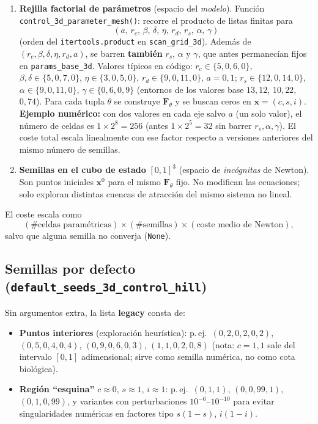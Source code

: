 \documentclass[11pt,a4paper]{article}
\begin{document}
\begin{enumerate}[label=\textbf{\arabic*.},leftmargin=*]
  \item \textbf{Rejilla factorial de parámetros} (espacio del \emph{modelo}). Función \texttt{control\_3d\_parameter\_mesh()}: recorre el producto de listas finitas para
  \[
  (a,\,r_c,\,\beta,\,\delta,\,\eta,\,r_d,\,r_s,\,\alpha,\,\gamma)
  \]
  (orden del \texttt{itertools.product} en \texttt{scan\_grid\_3d}). Además de $(r_c,\beta,\delta,\eta,r_d,a)$, se barren \textbf{también} $r_s$, $\alpha$ y $\gamma$, que antes permanecían fijos en \texttt{params\_base\_3d}. Valores típicos en código: $r_c\in\{5{,}0,6{,}0\}$, $\beta,\delta\in\{5{,}0,7{,}0\}$, $\eta\in\{3{,}0,5{,}0\}$, $r_d\in\{9{,}0,11{,}0\}$, $a=0{,}1$; $r_s\in\{12{,}0,14{,}0\}$, $\alpha\in\{9{,}0,11{,}0\}$, $\gamma\in\{0{,}6,0{,}9\}$ (entornos de los valores base $13{,}12$, $10{,}22$, $0{,}74$).
  Para cada tupla $\theta$ se construye $\mathbf{F}_{\theta}$ y se buscan ceros en $\mathbf{x}=(c,s,i)$.
  \textbf{Ejemplo numérico:} con dos valores en cada eje salvo $a$ (un solo valor), el número de celdas es $1\times 2^8=256$ (antes $1\times 2^5=32$ sin barrer $r_s,\alpha,\gamma$). El coste total escala linealmente con ese factor respecto a versiones anteriores del mismo número de semillas.
  \item \textbf{Semillas en el cubo de estado} $[0,1]^3$ (espacio de \emph{incógnitas} de Newton). Son puntos iniciales $\mathbf{x}^0$ para el mismo $\mathbf{F}_{\theta}$ fijo. No modifican las ecuaciones; solo exploran distintas cuencas de atracción del mismo sistema no lineal.
\end{enumerate}

El coste escala como
\[
(\text{\# celdas paramétricas})\times(\text{\# semillas})\times(\text{coste medio de Newton}),
\]
salvo que alguna semilla no converja (\texttt{None}).

\subsection{Semillas por defecto (\texttt{default\_seeds\_3d\_control\_hill})}

Sin argumentos extra, la lista \textbf{legacy} consta de:
\begin{itemize}[leftmargin=*]
  \item \textbf{Puntos interiores} (exploración heurística): p.\,ej.\ $(0{,}2,0{,}2,0{,}2)$, $(0{,}5,0{,}4,0{,}4)$, $(0{,}9,0{,}6,0{,}3)$, $(1{,}1,0{,}2,0{,}8)$ (nota: $c=1{,}1$ sale del intervalo $[0,1]$ adimensional; sirve como semilla numérica, no como cota biológica).
  \item \textbf{Región ``esquina''} $c\approx 0$, $s\approx 1$, $i\approx 1$: p.\,ej.\ $(0,1,1)$, $(0,0{,}99,1)$, $(0,1,0{,}99)$, y variantes con perturbaciones $10^{-6}$--$10^{-10}$ para evitar singularidades numéricas en factores tipo $s(1-s)$, $i(1-i)$.
\end{itemize}
\end{document}
